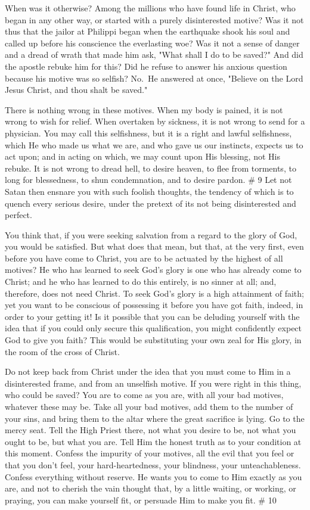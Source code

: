 \documentclass[
]{book}
\begin{document}
When was it otherwise? Among the millions who have found life in Christ, who began in any other way, or started with a purely disinterested motive? Was it not thus that the jailor at Philippi began when the earthquake shook his soul and called up before his conscience the everlasting woe? Was it not a sense of danger and a dread of wrath that made him ask, "What shall I do to be saved?" And did the apostle rebuke him for this? Did he refuse to answer his anxious question because his motive was so selfish? No.~He answered at once, "Believe on the Lord Jesus Christ, and thou shalt be saved."

There is nothing wrong in these motives. When my body is pained, it is not wrong to wish for relief. When overtaken by sickness, it is not wrong to send for a physician. You may call this selfishness, but it is a right and lawful selfishness, which He who made us what we are, and who gave us our instincts, expects us to act upon; and in acting on which, we may count upon His blessing, not His rebuke. It is not wrong to dread hell, to desire heaven, to flee from torments, to long for blessedness, to shun condemnation, and to desire pardon.
\# 9
Let not Satan then ensnare you with such foolish thoughts, the tendency of which is to quench every serious desire, under the pretext of its not being disinterested and perfect.

You think that, if you were seeking salvation from a regard to the glory of God, you would be satisfied. But what does that mean, but that, at the very first, even before you have come to Christ, you are to be actuated by the highest of all motives? He who has learned to seek God's glory is one who has already come to Christ; and he who has learned to do this entirely, is no sinner at all; and, therefore, does not need Christ. To seek God's glory is a high attainment of faith; yet you want to be conscious of possessing it before you have got faith, indeed, in order to your getting it! Is it possible that you can be deluding yourself with the idea that if you could only secure this qualification, you might confidently expect God to give you faith? This would be substituting your own zeal for His glory, in the room of the cross of Christ.

Do not keep back from Christ under the idea that you must come to Him in a disinterested frame, and from an unselfish motive. If you were right in this thing, who could be saved? You are to come as you are, with all your bad motives, whatever these may be. Take all your bad motives, add them to the number of your sins, and bring them to the altar where the great sacrifice is lying. Go to the mercy seat. Tell the High Priest there, not what you desire to be, not what you ought to be, but what you are. Tell Him the honest truth as to your condition at this moment. Confess the impurity of your motives, all the evil that you feel or that you don't feel, your hard-heartedness, your blindness, your unteachableness. Confess everything without reserve. He wants you to come to Him exactly as you are, and not to cherish the vain thought that, by a little waiting, or working, or praying, you can make yourself fit, or persuade Him to make you fit.
\# 10
\end{document}

